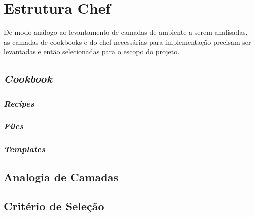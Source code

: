 \section{Estrutura Chef}
De modo análogo ao levantamento de camadas de ambiente a serem analisadas,
as camadas de cookbooks e do chef necessárias para implementação precisam
ser levantadas e então selecionadas para o escopo do projeto.

\subsection{\textit{Cookbook}}
\subsubsection{\textit{Recipes}}
\subsubsection{\textit{Files}}
\subsubsection{\textit{Templates}}

\subsection{Analogia de Camadas}

\subsection{Critério de Seleção}


